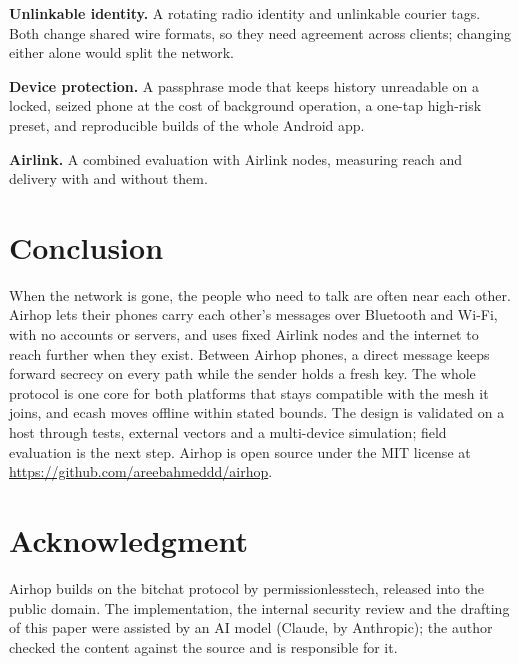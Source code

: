 \documentclass[conference]{IEEEtran}
\begin{document}
\textbf{Unlinkable identity.} A rotating radio identity and unlinkable courier tags. Both change shared wire formats, so they need agreement across clients; changing either alone would split the network.

\textbf{Device protection.} A passphrase mode that keeps history unreadable on a locked, seized phone at the cost of background operation, a one-tap high-risk preset, and reproducible builds of the whole Android app.

\textbf{Airlink.} A combined evaluation with Airlink nodes, measuring reach and delivery with and without them.

\section{Conclusion}
\label{sec:conclusion}

When the network is gone, the people who need to talk are often near each other. Airhop lets their phones carry each other's messages over Bluetooth and Wi-Fi, with no accounts or servers, and uses fixed Airlink nodes and the internet to reach further when they exist. Between Airhop phones, a direct message keeps forward secrecy on every path while the sender holds a fresh key. The whole protocol is one core for both platforms that stays compatible with the mesh it joins, and ecash moves offline within stated bounds. The design is validated on a host through tests, external vectors and a multi-device simulation; field evaluation is the next step. Airhop is open source under the MIT license at \url{https://github.com/areebahmeddd/airhop}.

\section*{Acknowledgment}
Airhop builds on the bitchat protocol by permissionlesstech, released into the public domain. The implementation, the internal security review and the drafting of this paper were assisted by an AI model (Claude, by Anthropic); the author checked the content against the source and is responsible for it.



\end{document}
